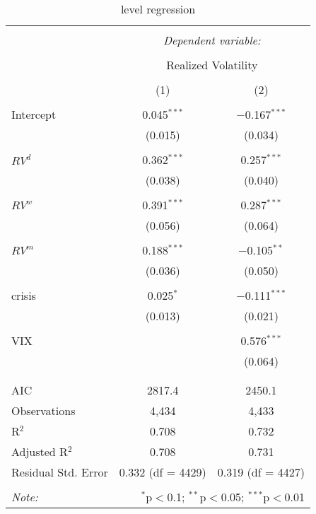 
\begin{table}[!htbp] \centering 
  \caption{level regression} 
  \label{} 
\begin{tabular}{@{\extracolsep{5pt}}lcc} 
\\[-1.8ex]\hline 
\hline \\[-1.8ex] 
 & \multicolumn{2}{c}{\textit{Dependent variable:}} \\ 
\cline{2-3} 
\\[-1.8ex] & \multicolumn{2}{c}{Realized Volatility} \\ 
\\[-1.8ex] & (1) & (2)\\ 
\hline \\[-1.8ex] 
 Intercept & 0.045$^{***}$ & $-$0.167$^{***}$ \\ 
  & (0.015) & (0.034) \\ 
  & & \\ 
 $RV^{d}$ & 0.362$^{***}$ & 0.257$^{***}$ \\ 
  & (0.038) & (0.040) \\ 
  & & \\ 
 $RV^{w}$ & 0.391$^{***}$ & 0.287$^{***}$ \\ 
  & (0.056) & (0.064) \\ 
  & & \\ 
 $RV^{m}$ & 0.188$^{***}$ & $-$0.105$^{**}$ \\ 
  & (0.036) & (0.050) \\ 
  & & \\ 
 crisis & 0.025$^{*}$ & $-$0.111$^{***}$ \\ 
  & (0.013) & (0.021) \\ 
  & & \\ 
 VIX &  & 0.576$^{***}$ \\ 
  &  & (0.064) \\ 
  & & \\ 
\hline \\[-1.8ex] 
AIC & 2817.4 & 2450.1 \\ 
Observations & 4,434 & 4,433 \\ 
R$^{2}$ & 0.708 & 0.732 \\ 
Adjusted R$^{2}$ & 0.708 & 0.731 \\ 
Residual Std. Error & 0.332 (df = 4429) & 0.319 (df = 4427) \\ 
\hline 
\hline \\[-1.8ex] 
\textit{Note:}  & \multicolumn{2}{r}{$^{*}$p$<$0.1; $^{**}$p$<$0.05; $^{***}$p$<$0.01} \\ 
\end{tabular} 
\end{table} 

